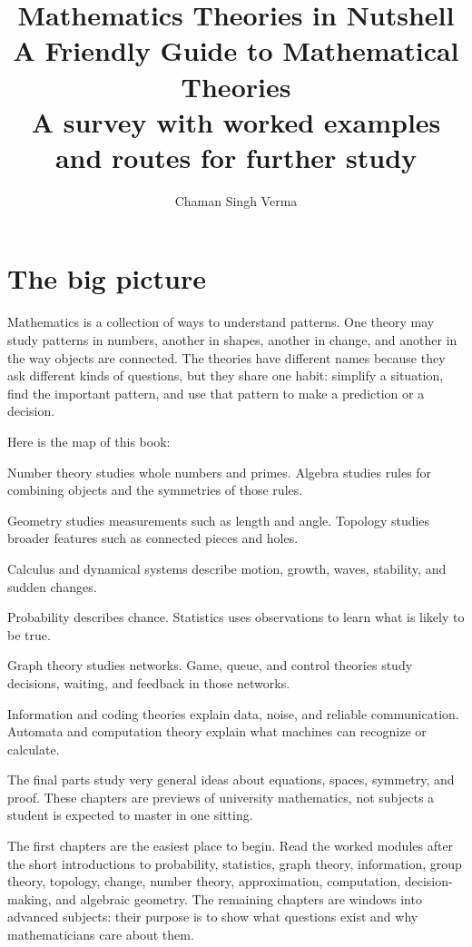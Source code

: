 \documentclass[11pt,oneside]{book}
\title{\Huge Mathematics Theories in Nutshell\\[6pt]\large A Friendly Guide to Mathematical Theories\\[4pt]\normalsize A survey with worked examples and routes for further study}
\author{Chaman Singh Verma}
\date{}
\begin{document}
\maketitle
\frontmatter
\chapter*{The big picture}
Mathematics is a collection of ways to understand patterns. One theory may study patterns in numbers, another in shapes, another in change, and another in the way objects are connected. The theories have different names because they ask different kinds of questions, but they share one habit: simplify a situation, find the important pattern, and use that pattern to make a prediction or a decision.

Here is the map of this book:
\begin{description}[leftmargin=3.4cm,style=nextline]
\item[Numbers] Number theory studies whole numbers and primes. Algebra studies rules for combining objects and the symmetries of those rules.
\item[Shapes] Geometry studies measurements such as length and angle. Topology studies broader features such as connected pieces and holes.
\item[Change] Calculus and dynamical systems describe motion, growth, waves, stability, and sudden changes.
\item[Uncertainty] Probability describes chance. Statistics uses observations to learn what is likely to be true.
\item[Connections] Graph theory studies networks. Game, queue, and control theories study decisions, waiting, and feedback in those networks.
\item[Messages and machines] Information and coding theories explain data, noise, and reliable communication. Automata and computation theory explain what machines can recognize or calculate.
\item[Deep structure] The final parts study very general ideas about equations, spaces, symmetry, and proof. These chapters are previews of university mathematics, not subjects a student is expected to master in one sitting.
\end{description}

The first chapters are the easiest place to begin. Read the worked modules after the short introductions to probability, statistics, graph theory, information, group theory, topology, change, number theory, approximation, computation, decision-making, and algebraic geometry. The remaining chapters are windows into advanced subjects: their purpose is to show what questions exist and why mathematicians care about them.
\end{document}
